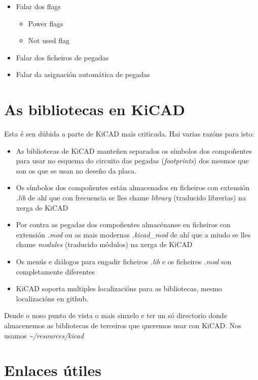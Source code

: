 \begin{itemize}
\itemsep1pt\parskip0pt
\item
  Falar dos flags

  \begin{itemize}
  \itemsep1pt\parskip0pt
  \item
    Power flags
  \item
    Not used flag
  \end{itemize}
\item
  Falar dos ficheiros de pegadas
\item
  Falar da asignación automática de pegadas
\end{itemize}

\section{As bibliotecas en KiCAD}\label{as-bibliotecas-en-kicad}

Esta é sen dúbida a parte de KiCAD mais criticada. Hai varias razóns
para isto:

\begin{itemize}
\itemsep1pt\parskip0pt
\item
  As bibliotecas de KiCAD manteñen separados os símbolos dos compoñentes
  para usar no esquema do circuito das pegadas (\emph{footprints}) dos
  mesmos que son os que se usan no deseño da placa.
\item
  Os símbolos dos compoñentes están almacenados en ficheiros con
  extensión \emph{.lib} de ahí que con frecuencia se lles chame
  \emph{library} (traducido librerias) na xerga de KiCAD
\item
  Por contra as pegadas dos compoñentes almacénanse en ficheiros con
  extensión \emph{.mod} ou as mais modernas \emph{.kicad\_mod} de ahí
  que a miudo se lles chame \emph{modules} (traducido módulos) na xerga
  de KiCAD
\item
  Os menús e diálogos para engadir ficheiros \emph{.lib} e os ficheiros
  \emph{.mod} son completamente diferentes
\item
  KiCAD soporta multiples localizacións para as bibliotecas, mesmo
  localizacións en github.
\end{itemize}

Dende o noso punto de vista o mais sinxelo e ter un só directorio donde
almacenemos as bibliotecas de terceiros que queremos usar con KiCAD. Nos
usamos \emph{\textasciitilde{}/resources/kicad}

\section{Enlaces útiles}\label{enlaces-uxfatiles}

